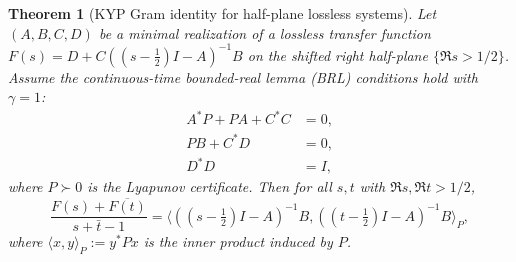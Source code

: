 \documentclass[11pt]{article}
\newtheorem{theorem}{Theorem}
\theoremstyle{remark}
\begin{document}
\begin{theorem}[KYP Gram identity for half-plane lossless systems]\label{thm:KYP-gram-appendix}
Let $(A, B, C, D)$ be a minimal realization of a lossless transfer function $F(s) = D + C((s-\tfrac12)I - A)^{-1}B$ on the shifted right half-plane $\{\Re s > 1/2\}$. Assume the continuous-time bounded-real lemma (BRL) conditions hold with $\gamma = 1$:
\begin{align}
  A^* P + P A + C^* C &= 0, \label{eq:brl1}\\
  P B + C^* D &= 0, \label{eq:brl2}\\
  D^* D &= I, \label{eq:brl3}
\end{align}
where $P \succ 0$ is the Lyapunov certificate. Then for all $s, t$ with $\Re s, \Re t > 1/2$,
\[
  \frac{F(s) + \overline{F(t)}}{s + \bar t - 1} = \langle ((s-\tfrac12)I - A)^{-1}B, ((t-\tfrac12)I - A)^{-1}B \rangle_P,
\]
where $\langle x, y \rangle_P := y^* P x$ is the inner product induced by $P$.
\end{theorem}
\end{document}
